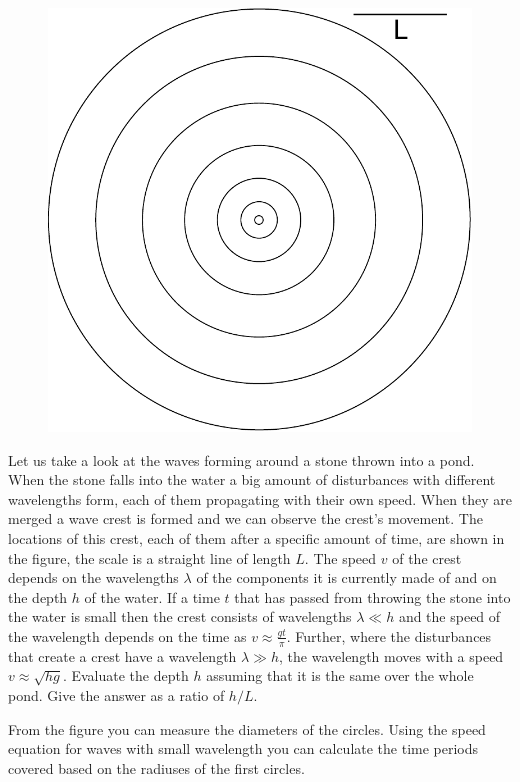 \begin{figure}%
\includegraphics[width=\linewidth]{2013-v3g-06-lained}%
\end{figure}
Let us take a look at the waves forming around a stone thrown into a pond. When the stone falls into the water a big amount of disturbances with different wavelengths form, each of them propagating with their own speed. When they are merged a wave crest is formed and we can observe the crest’s movement. The locations of this crest, each of them after a specific amount of time, are shown in the figure, the scale is a straight line of length $L$. The speed $v$ of the crest depends on the wavelengths $\lambda$ of the components it is currently made of and on the depth $h$ of the water. If a time $t$ that has passed from throwing the stone into the water is small then the crest consists of wavelengths $\lambda \ll h$ and the speed of the wavelength depends on the time as $v \approx \frac{gt}{\pi}$. Further, where the disturbances that create a crest have a wavelength $\lambda \gg h$, the wavelength moves with a speed $v
\approx \sqrt{hg}$. Evaluate the depth $h$ assuming that it is the same over the whole pond. Give the answer as a ratio of $h/L$.

\hinteng
From the figure you can measure the diameters of the circles. Using the speed equation for waves with small wavelength you can calculate the time periods covered based on the radiuses of the first circles.

